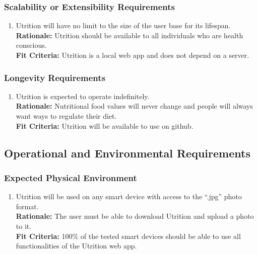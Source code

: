 \documentclass[12pt]{article}
\begin{document}
{\subsubsection{Scalability or Extensibility Requirements}

\begin{enumerate}[{PR}8. ] 
	\item Utrition will have no limit to the size of the user base for its lifespan. \\
	\textbf{Rationale:} Utrition should be available to all individuals who are health conscious.\\
	\textbf{Fit Criteria:} Utrition is a local web app and does not depend on a server.
\end{enumerate}

\subsubsection{Longevity Requirements}

\begin{enumerate}[{PR}9. ] 
	\item Utrition is expected to operate indefinitely.\\
	\textbf{Rationale:} Nutritional food values will never change and people will always want ways to regulate their diet. \\
	\textbf{Fit Criteria:} Utrition will be available to use on github.
\end{enumerate}

\subsection{Operational and Environmental Requirements}

\subsubsection{Expected Physical Environment}
\begin{enumerate}[{OE}1. ] 
	\item Utrition will be used on any smart device with access to the “.jpg” photo format.\\
	\textbf{Rationale:} The user must be able to download Utrition and upload a photo to it. \\
	\textbf{Fit Criteria:} 100\% of the tested smart devices should be able to use all functionalities of the Utrition web app.
\end{enumerate}

}
\end{document}
